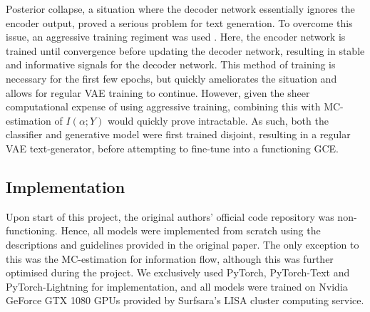 Posterior collapse, a situation where the decoder network essentially ignores the encoder output, proved a serious problem for text generation. To overcome this issue, an aggressive training regiment was used \cite{he2019lagging}. Here, the encoder network is trained until convergence before updating the decoder network, resulting in stable and informative signals for the decoder network. This method of training is necessary for the first few epochs, but quickly ameliorates the situation and allows for regular VAE training to continue. However, given the sheer computational expense of using aggressive training, combining this with MC-estimation of $I(\alpha;Y)$ would quickly prove intractable. As such, both the classifier and generative model were first trained disjoint, resulting in a regular VAE text-generator, before attempting to fine-tune into a functioning GCE.


\subsection{Implementation}

Upon start of this project, the original authors' official code repository was non-functioning. Hence, all models were implemented from scratch using the descriptions and guidelines provided in the original paper. The only exception to this was the MC-estimation for information flow, although this was further optimised during the project. We exclusively used PyTorch, PyTorch-Text and PyTorch-Lightning for implementation, and all models were trained on Nvidia GeForce GTX 1080 GPUs provided by Surfsara's LISA cluster computing service. 



